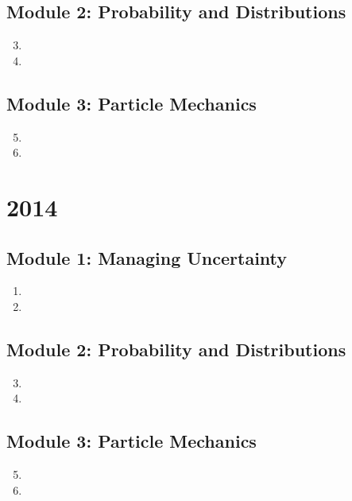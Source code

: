 \documentclass[fleqn,titlepage]{book}
\numberwithin{equation}{section}
\theoremstyle{plain}
\theoremstyle{definition}
\theoremstyle{remark}
\begin{document}
\section{Module 2: Probability and Distributions}
\begin{enumerate}[label=\bfseries  \arabic*.]\setcounter{enumi}{2}
\item 
\item 
\end{enumerate}
\section{Module 3: Particle Mechanics}
\begin{enumerate}[label=\bfseries  \arabic*.]\setcounter{enumi}{4}
\item 
\item 
\end{enumerate}

\chapter{2014}
\section{Module 1: Managing Uncertainty}
\begin{enumerate}[label=\bfseries  \arabic*.]\setcounter{enumi}{0}
\item 
\item 
\end{enumerate}
\section{Module 2: Probability and Distributions}
\begin{enumerate}[label=\bfseries  \arabic*.]\setcounter{enumi}{2}
\item 
\item 
\end{enumerate}
\section{Module 3: Particle Mechanics}
\begin{enumerate}[label=\bfseries  \arabic*.]\setcounter{enumi}{4}
\item 
\item 
\end{enumerate}
\end{document}
